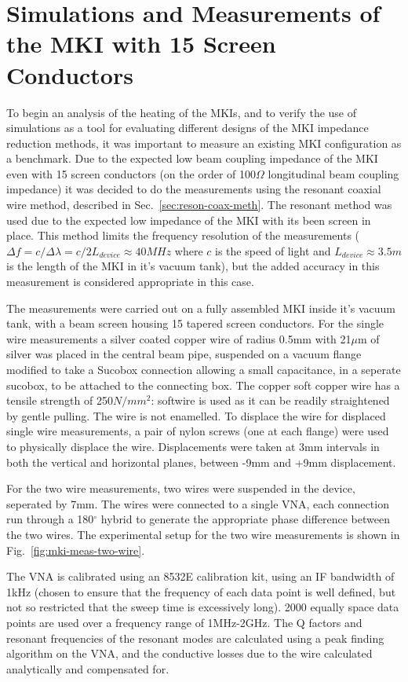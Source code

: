 \section{Simulations and Measurements of the MKI with 15 Screen Conductors}

To begin an analysis of the heating of the MKIs, and to verify the use of simulations as a tool for evaluating different designs of the MKI impedance reduction methods, it was important to measure an existing MKI configuration as a benchmark. Due to the expected low beam coupling impedance of the MKI even with 15 screen conductors (on the order of 100$\Omega$ longitudinal beam coupling impedance) it was decided to do the measurements using the resonant coaxial wire method, described in Sec.~\ref{sec:reson-coax-meth}. The resonant method was used due to the expected low impedance of the MKI with its been screen in place. This method limits the frequency resolution of the measurements ($\Delta{} f = c/ \Delta \lambda = c/2L_{device} \approx 40MHz$ where $c$ is the speed of light and $L_{device}\approx 3.5m$ is the length of the MKI in it's vacuum tank), but the added accuracy in this measurement is considered appropriate in this case.

The measurements were carried out on a fully assembled MKI inside it's vacuum tank, with a beam screen housing 15 tapered screen conductors. For the single wire measurements a silver coated copper wire of radius 0.5mm with 21$\mu$m of silver was placed in the central beam pipe, suspended on a vacuum flange modified to take a Sucobox connection allowing a small capacitance, in a seperate sucobox, to be attached to the connecting box. The copper soft copper wire has a tensile strength of 250$N/mm^{2}$: softwire is used as it can be readily straightened by gentle pulling. The wire is not enamelled. To displace the wire for displaced single wire measurements, a pair of nylon screws (one at each flange) were used to physically displace the wire. Displacements were taken at 3mm intervals in both the vertical and horizontal planes, between -9mm and +9mm displacement.

For the two wire measurements, two wires were suspended in the device, seperated by 7mm. The wires were connected to a single VNA, each connection run through a 180$^{\circ}$ hybrid to generate the appropriate phase difference between the two wires. The experimental setup for the two wire measurements is shown in Fig.~\ref{fig:mki-meas-two-wire}.

The VNA is calibrated using an 8532E calibration kit, using an IF bandwidth of 1kHz (chosen to ensure that the frequency of each data point is well defined, but not so restricted that the sweep time is excessively long). 2000 equally space data points are used over a frequency range of 1MHz-2GHz. The Q factors and resonant frequencies of the resonant modes are calculated using a peak finding algorithm on the VNA, and the conductive losses due to the wire calculated analytically and compensated for.


